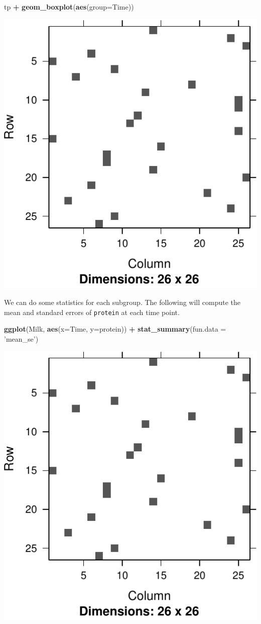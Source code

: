 \documentclass[]{book}
\newenvironment{Shaded}{\begin{snugshade}}{\end{snugshade}}
\newcommand{\DataTypeTok}[1]{\textcolor[rgb]{0.13,0.29,0.53}{#1}}
\newcommand{\KeywordTok}[1]{\textcolor[rgb]{0.13,0.29,0.53}{\textbf{#1}}}
\newcommand{\NormalTok}[1]{#1}
\newcommand{\OperatorTok}[1]{\textcolor[rgb]{0.81,0.36,0.00}{\textbf{#1}}}
\newcommand{\StringTok}[1]{\textcolor[rgb]{0.31,0.60,0.02}{#1}}
\theoremstyle{definition}
\theoremstyle{definition}
\theoremstyle{definition}
\theoremstyle{remark}
\begin{document}
\begin{Shaded}
\begin{Highlighting}[]
\NormalTok{tp }\OperatorTok{+}\StringTok{ }\KeywordTok{geom_boxplot}\NormalTok{(}\KeywordTok{aes}\NormalTok{(}\DataTypeTok{group=}\NormalTok{Time))}
\end{Highlighting}
\end{Shaded}

\includegraphics[width=0.5\linewidth]{Rcourse_files/figure-latex/unnamed-chunk-281-1}

We can do some statistics for each subgroup.
The following will compute the mean and standard errors of \texttt{protein} at each time point.

\begin{Shaded}
\begin{Highlighting}[]
\KeywordTok{ggplot}\NormalTok{(Milk, }\KeywordTok{aes}\NormalTok{(}\DataTypeTok{x=}\NormalTok{Time, }\DataTypeTok{y=}\NormalTok{protein)) }\OperatorTok{+}
\StringTok{  }\KeywordTok{stat_summary}\NormalTok{(}\DataTypeTok{fun.data =} \StringTok{'mean_se'}\NormalTok{)}
\end{Highlighting}
\end{Shaded}

\includegraphics[width=0.5\linewidth]{Rcourse_files/figure-latex/unnamed-chunk-282-1}
\end{document}
